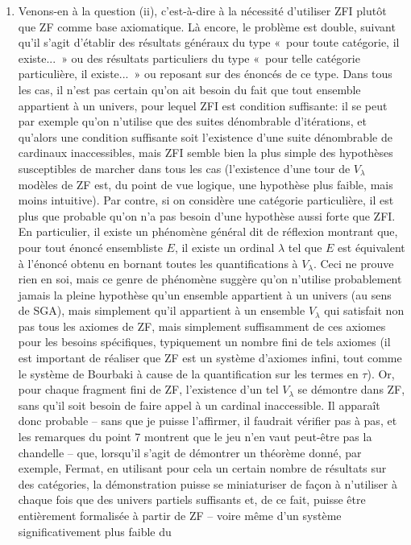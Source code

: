 \documentclass[10pt]{fichiers-configuration-latex/smfart}
\begin{document}
\begin{enumerate}
\item Venons-en à la question (ii), c'est-à-dire à la nécessité
d'utiliser ZFI plutôt que ZF comme base axiomatique. Là
encore, le problème est double, suivant qu'il s'agit
d'établir des résultats généraux du type « pour toute
catégorie, il existe... » ou des résultats particuliers du
type « pour telle catégorie particulière, il existe... » ou
reposant sur des énoncés de ce type. Dans tous les cas, il
n'est pas certain qu'on ait besoin du fait que tout ensemble
appartient à un univers, pour lequel ZFI est condition
suffisante: il se peut par exemple qu'on n'utilise que des
suites dénombrable d'itérations, et qu'alors une condition
suffisante soit l'existence d'une suite dénombrable de
cardinaux inaccessibles, mais ZFI semble bien la plus simple
des hypothèses susceptibles de marcher dans tous les cas
(l'existence d'une tour de $V_\lambda$ modèles de ZF est, du
point de vue logique, une hypothèse plus faible, mais moins
intuitive). Par contre, si on considère une catégorie
particulière, il est plus que probable qu'on n'a pas besoin
d'une hypothèse aussi forte que ZFI. En particulier, il
existe un phénomène général dit de réflexion montrant que,
pour tout énoncé ensembliste $E$, il existe un ordinal
$\lambda$ tel que $E$ est équivalent à l'énoncé obtenu en
bornant toutes les quantifications à $V_\lambda$. Ceci ne
prouve rien en soi, mais ce genre de phénomène suggère qu'on
n'utilise probablement jamais la pleine hypothèse qu'un
ensemble appartient à un univers (au sens de SGA), mais
simplement qu'il appartient à un ensemble $V_\lambda$ qui
satisfait non pas tous les axiomes de ZF, mais simplement
suffisamment de ces axiomes pour les besoins spécifiques,
typiquement un nombre fini de tels axiomes (il est important
de réaliser que ZF est un système d'axiomes infini, tout
comme le système de Bourbaki à cause de la quantification
sur les termes en $\tau$). Or, pour chaque fragment fini de
ZF, l'existence d'un tel $V_\lambda$ se démontre dans ZF,
sans qu'il soit besoin de faire appel à un cardinal
inaccessible. Il apparaît donc probable -- sans que je
puisse l'affirmer, il faudrait vérifier pas à pas, et les
remarques du point 7 montrent que le jeu n'en vaut peut-être
pas la chandelle -- que, lorsqu'il s'agit de démontrer un
théorème donné, par exemple, Fermat, en utilisant pour cela
un certain nombre de résultats sur des catégories, la
démonstration puisse se miniaturiser de façon à n'utiliser à
chaque fois que des univers partiels suffisants et, de ce
fait, puisse être entièrement formalisée à partir de ZF --
voire même d'un système significativement plus faible du

\end{enumerate}
\end{document}
